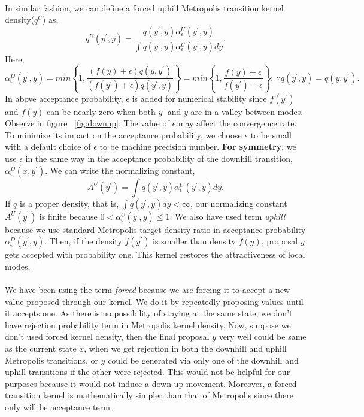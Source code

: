 \documentclass{article}
\begin{document}
\paragraph{}In similar fashion, we can define a forced uphill Metropolis transition kernel density($q^U$) as,
\begin{equation*}
    q^U(y^{'},y)=\frac{q(y^{'},y)\alpha_{\epsilon}^U(y^{'},y)}{\int q(y^{'},y)\alpha_{\epsilon}^U(y^{'},y)dy}.
\end{equation*}
Here,
\begin{equation*}
    \alpha_{\epsilon}^D(y^{'},y)=min\left\{1,\frac{(f(y)+\epsilon)q(y,y^{'})}{(f(y^{'})+\epsilon)q(y^{'},y)}\right\}=min\left\{1,\frac{f(y)+\epsilon}{f(y^{'})+\epsilon}\right\};\ \because q(y^{'},y)=q(y,y^{'}).
\end{equation*}
In above acceptance probability, $\epsilon$ is added for numerical stability since $f(y^{'})$ and $f(y)$ can be nearly zero when both $y^{'}$ and $y$ are in a valley between modes. Observe in figure ~\ref{fig:downup}. The value of $\epsilon$ may affect the convergence rate. To minimize its impact on the acceptance probability, we choose $\epsilon$ to be small with a default choice of $\epsilon$ to be machine precision number. \textbf{For symmetry}, we use $\epsilon$ in the same way in the acceptance probability of the downhill transition, $\alpha_{\epsilon}^D(x,y^{'})$.
We can write the normalizing constant, $$A^U(y^{'})=\int q(y^{'},y)\alpha_{\epsilon}^U(y^{'},y)dy.$$
If $q$ is a proper density, that is, $\int q(y^{'},y)dy < \infty$, our normalizing constant $A^U(y^{'})$ is finite because $0<\alpha_{\epsilon}^U(y^{'},y) \leq 1$. We also have used term \textit{uphill} because we use standard Metropolis target density ratio in acceptance probability $\alpha_{\epsilon}^D(y^{'},y)$. Then, if the density $f(y^{'})$ is smaller than density $f(y)$, proposal $y$ gets accepted with probability one. This kernel restores the attractiveness of local modes. 
\paragraph{}We have been using the term \textit{forced} because we are forcing it to accept a new value proposed through our kernel. We do it by repeatedly proposing values until it accepts one. As there is no possibility of staying at the same state, we don't have rejection probability term in Metropolis kernel density. Now, suppose we don't used forced kernel density, then the final proposal $y$ very well could be same as the current state $x$, when we get rejection in both the downhill and uphill Metropolis transitions, or $y$ could
be generated via only one of the downhill and uphill transitions if the other were rejected. This would not be helpful for
our purposes because it would not induce a down-up movement. Moreover, a forced transition kernel is mathematically
simpler than that of Metropolis since there only will be acceptance term.
\end{document}
